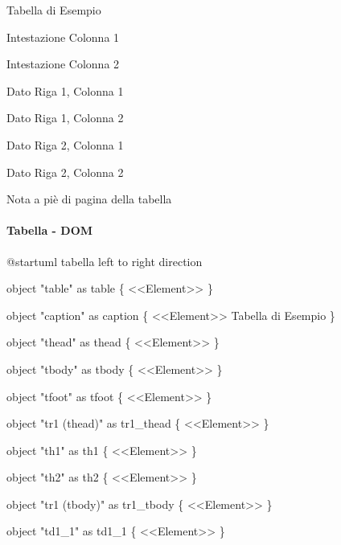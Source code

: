 \documentclass[
]{article}
\newenvironment{Shaded}{}{}
\newcommand{\NormalTok}[1]{#1}
\begin{document}
Tabella di Esempio

Intestazione Colonna 1

Intestazione Colonna 2

Dato Riga 1, Colonna 1

Dato Riga 1, Colonna 2

Dato Riga 2, Colonna 1

Dato Riga 2, Colonna 2

Nota a piè di pagina della tabella

\paragraph{Tabella - DOM}\label{tabella---dom}

\begin{Shaded}
\begin{Highlighting}[]
\NormalTok{@startuml tabella}
\NormalTok{left to right direction}

\NormalTok{object "table" as table \{}
\NormalTok{  \textless{}\textless{}Element\textgreater{}\textgreater{}}
\NormalTok{\}}

\NormalTok{object "caption" as caption \{}
\NormalTok{  \textless{}\textless{}Element\textgreater{}\textgreater{}}
\NormalTok{  Tabella di Esempio}
\NormalTok{\}}

\NormalTok{object "thead" as thead \{}
\NormalTok{  \textless{}\textless{}Element\textgreater{}\textgreater{}}
\NormalTok{\}}

\NormalTok{object "tbody" as tbody \{}
\NormalTok{  \textless{}\textless{}Element\textgreater{}\textgreater{}}
\NormalTok{\}}

\NormalTok{object "tfoot" as tfoot \{}
\NormalTok{  \textless{}\textless{}Element\textgreater{}\textgreater{}}
\NormalTok{\}}

\NormalTok{object "tr1 (thead)" as tr1\_thead \{}
\NormalTok{  \textless{}\textless{}Element\textgreater{}\textgreater{}}
\NormalTok{\}}

\NormalTok{object "th1" as th1 \{}
\NormalTok{  \textless{}\textless{}Element\textgreater{}\textgreater{}}
\NormalTok{\}}

\NormalTok{object "th2" as th2 \{}
\NormalTok{  \textless{}\textless{}Element\textgreater{}\textgreater{}}
\NormalTok{\}}

\NormalTok{object "tr1 (tbody)" as tr1\_tbody \{}
\NormalTok{  \textless{}\textless{}Element\textgreater{}\textgreater{}}
\NormalTok{\}}

\NormalTok{object "td1\_1" as td1\_1 \{}
\NormalTok{  \textless{}\textless{}Element\textgreater{}\textgreater{}}
\NormalTok{\}}


\end{Highlighting}
\end{Shaded}
\end{document}
